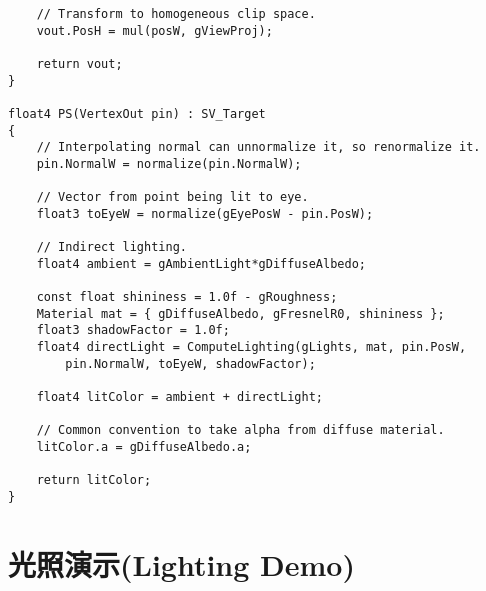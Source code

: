 \begin{lstlisting}
    // Transform to homogeneous clip space.
    vout.PosH = mul(posW, gViewProj);

    return vout;
}

float4 PS(VertexOut pin) : SV_Target
{
    // Interpolating normal can unnormalize it, so renormalize it.
    pin.NormalW = normalize(pin.NormalW);

    // Vector from point being lit to eye. 
    float3 toEyeW = normalize(gEyePosW - pin.PosW);

    // Indirect lighting.
    float4 ambient = gAmbientLight*gDiffuseAlbedo;

    const float shininess = 1.0f - gRoughness;
    Material mat = { gDiffuseAlbedo, gFresnelR0, shininess };
    float3 shadowFactor = 1.0f;
    float4 directLight = ComputeLighting(gLights, mat, pin.PosW,
        pin.NormalW, toEyeW, shadowFactor);

    float4 litColor = ambient + directLight;

    // Common convention to take alpha from diffuse material.
    litColor.a = gDiffuseAlbedo.a;

    return litColor;
}
\end{lstlisting}

\section{光照演示(Lighting Demo)}



